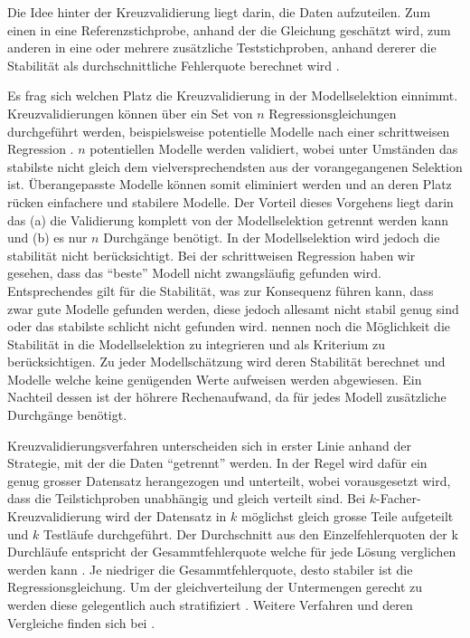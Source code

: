 \documentclass[english,12pt,doc]{apa}
\begin{document}
Die Idee hinter der Kreuzvalidierung liegt darin, die Daten aufzuteilen. Zum einen in eine Referenzstichprobe, anhand der die Gleichung geschätzt wird, zum anderen in eine oder mehrere zusätzliche Teststichproben, anhand dererer die Stabilität als durchschnittliche Fehlerquote berechnet wird \cite[p. 3]{arlot2010survey}.

Es frag sich welchen Platz die Kreuzvalidierung in der Modellselektion einnimmt.
Kreuzvalidierungen können über ein Set von $n$ Regressionsgleichungen durchgeführt werden, beispielsweise  potentielle Modelle nach einer schrittweisen Regression \cite[p. 12]{arlot2010survey}.
$n$ potentiellen Modelle werden validiert, wobei unter Umständen das stabilste nicht gleich dem vielversprechendsten aus der vorangegangenen Selektion ist.
 Überangepasste Modelle können somit eliminiert werden und an deren Platz rücken einfachere und stabilere Modelle.
Der Vorteil dieses Vorgehens liegt darin das (a) die Validierung komplett von der Modellselektion getrennt werden kann und (b) es nur $n$ Durchgänge benötigt. 
In der Modellselektion wird jedoch die stabilität nicht berücksichtigt. 
Bei der schrittweisen Regression haben wir gesehen, dass das ``beste'' Modell nicht zwangsläufig gefunden wird.
Entsprechendes gilt für die Stabilität, was zur Konsequenz führen kann, dass zwar gute Modelle gefunden werden, diese jedoch allesamt nicht stabil genug sind oder das stabilste schlicht nicht gefunden wird. 
 nennen noch die Möglichkeit die Stabilität in die Modellselektion zu integrieren und als  Kriterium zu berücksichtigen. 
Zu jeder Modellschätzung wird deren Stabilität berechnet und Modelle welche keine genügenden Werte aufweisen werden abgewiesen. Ein Nachteil dessen ist der höhrere Rechenaufwand, da für jedes Modell zusätzliche Durchgänge benötigt.

Kreuzvalidierungsverfahren unterscheiden sich in erster Linie anhand der Strategie, mit der die Daten ``getrennt'' werden.
In der Regel wird dafür ein genug grosser Datensatz herangezogen und unterteilt, wobei vorausgesetzt wird, dass die Teilstichproben unabhängig und gleich verteilt sind. 
Bei $k$-Facher-Kreuzvalidierung wird der Datensatz in $k$ möglichst gleich grosse Teile aufgeteilt und $k$ Testläufe durchgeführt.
 Der Durchschnitt aus den Einzelfehlerquoten der k Durchläufe entspricht der Gesammtfehlerquote welche für jede Lösung verglichen werden kann \cite[p. 14]{arlot2010survey}.
Je niedriger die Gesammtfehlerquote, desto stabiler ist die Regressionsgleichung.
Um der gleichverteilung der Untermengen gerecht zu werden diese gelegentlich auch stratifiziert \cite{diamantidis2000unsupervised}. 
Weitere Verfahren und deren Vergleiche finden sich bei .
\end{document}
